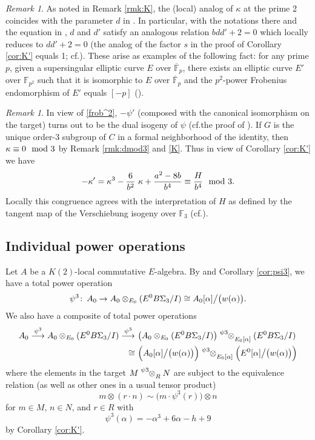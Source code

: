 \documentclass{gtpart}
\theoremstyle{definition}
\theoremstyle{remark}
\newtheorem{rmk}[thm]{Remark}
\def\co{\colon\thinspace}
\newcommand{\mb}[1]{\mathbb{#1}}
\newcommand{\cF}{\overline {\mb F}}
\newcommand{\cf}{cf.\thinspace}
\newcommand{\BF}{{\mb F}}
\newcommand{\md}{~~{\rm mod}~}
\newcommand{\A}{\alpha}
\newcommand{\K}{\kappa}
\newcommand{\p}{\psi^3}
\begin{document}
\begin{rmk}
\label{rmk:KK'}
 As noted in Remark \ref{rmk:K}, the (local) analog of $\K$ at the prime 2 coincides with the parameter $d$ in \cite[Section 3]{h2p2}.  
 In particular, with the notations there and the equation in \cite[Proposition 3.2]{tmf3}, 
 $d$ and $d'$ satisfy an analogous relation $b d d' + 2 = 0$ which locally reduces to $d d' + 2 = 0$ 
 (the analog of the factor $s$ in the proof of Corollary \ref{cor:K'} equals 1; \cf \cite[Theorem 2.5.7]{andoduke}).  
 These arise as examples of the following fact: 
 for any prime $p$, given a supersingular elliptic curve $E$ over $\cF_p$, 
 there exists an elliptic curve $E'$ over $\BF_{p^2}$ such that it is isomorphic to $E$ over $\cF_p$ 
 and the $p^2$-power Frobenius endomorphism of $E'$ equals $[-p]$ (\cite[Lemma 3.21]{poonen}).  
\end{rmk}

\begin{rmk}
\label{rmk:K'}
 In view of \eqref{frob^2}, $-\psi'$ (composed with the canonical isomorphism on the target) 
 turns out to be the dual isogeny of $\psi$ (\cf the proof of \cite[2.9.4]{KM}).  
 If $G$ is the unique order-3 subgroup of $C$ in a formal neighborhood of the identity, then $\K \equiv 0 \md 3$ by Remark \ref{rmk:dmod3} and \eqref{K}.  
 Thus in view of Corollary \ref{cor:K'} we have 
 \[
  -\K' = \K^3 - \frac{6}{b^2} ~ \K + \frac{a^2 - 8 b}{b^4} \equiv \frac{H}{b^4} \md 3.  
 \]
 Locally this congruence agrees with the interpretation of $H$ as defined by the tangent map of the Verschiebung isogeny over $\BF_3$ (\cf \cite[12.4.1]{KM}).  
\end{rmk}


\subsection{Individual power operations}

Let $A$ be a $K(2)$-local commutative $E$-algebra.  
By \cite[3.23]{cong} and Corollary \ref{cor:psi3}, 
we have a total power operation 
\[
 \p \co A_0 \to A_0 \otimes_{E_0} (E^0 B\Sigma_3 / I) \cong A_0 [\A] \big/ \big( w(\A) \big).  
\]
We also have a composite of total power operations 
\begin{equation}
\label{psi3^2}
\begin{split}
 A_0 \stackrel{\p}{\longrightarrow} A_0 \otimes_{E_0} (E^0 B\Sigma_3 / I) \stackrel{\p}{\longrightarrow} 
 & ~ \big( A_0 \otimes_{E_0} (E^0 B\Sigma_3 / I) \big) \tensor[^\p]{\otimes}{_{E_0 [\A]}} (E^0 B\Sigma_3 / I) \\
\cong & ~ \Big( A_0 [\A] \big/ \big( w(\A) \big) \Big) \tensor[^\p]{\otimes}{_{E_0 [\A]}} \Big( E^0 [\A] \big/ \big( w(\A) \big) \Big) 
\end{split}
\end{equation}
where the elements in the target $M \tensor[^\p]{\otimes}{_R} N$ are subject to the equivalence relation (as well as other ones in a usual tensor product) 
\[
 m \otimes (r \cdot n) \sim \big( m \cdot \p(r) \big) \otimes n 
\]
for $m \in M$, $n \in N$, and $r \in R$ with 
\[
 \p(\A) = -\A^3 + 6 \A - h + 9 
\]
by Corollary \ref{cor:K'}.  
\end{document}
